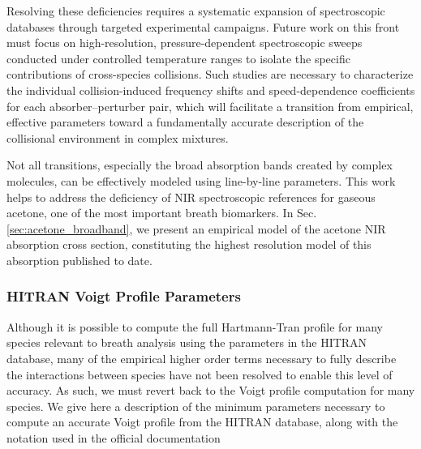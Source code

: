 \documentclass[12pt]{report}
\begin{document}
	Resolving these deficiencies requires a systematic expansion of spectroscopic databases through targeted experimental campaigns. Future work on this front must focus on high-resolution, pressure-dependent spectroscopic sweeps conducted under controlled temperature ranges to isolate the specific contributions of cross-species collisions. Such studies are necessary to characterize the individual collision-induced frequency shifts and speed-dependence coefficients for each absorber–perturber pair, which will facilitate a transition from empirical, effective parameters toward a fundamentally accurate description of the collisional environment in complex mixtures.
	
	Not all transitions, especially the broad absorption bands created by complex molecules, can be effectively modeled using line-by-line parameters. This work helps to address the deficiency of NIR spectroscopic references for gaseous acetone, one of the most important breath biomarkers. In Sec. \ref{sec:acetone_broadband}, we present an empirical model of the acetone NIR absorption cross section, constituting the highest resolution model of this absorption published to date.
	
	\subsubsection{HITRAN Voigt Profile Parameters}
	Although it is possible to compute the full Hartmann-Tran profile for many species relevant to breath analysis using the parameters in the HITRAN database, many of the empirical higher order terms necessary to fully describe the interactions between species have not been resolved to enable this level of accuracy. As such, we must revert back to the Voigt profile computation for many species. We give here a description of the minimum parameters necessary to compute an accurate Voigt profile from the HITRAN database, along with the notation used in the official documentation
	
\end{document}
